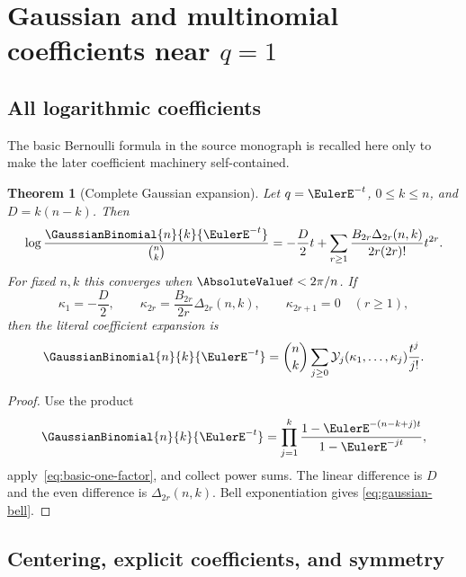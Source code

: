 \documentclass[11pt,oneside]{article}
\newtheorem{theorem}{Theorem}[section]
\theoremstyle{definition}
\theoremstyle{remark}
\newcommand{\Bell}{\mathcal Y}
\let\reporttopsection\section
\let\reportsubsection\subsection
\let\chapter\reporttopsection
\let\section\reportsubsection
\begin{document}
\chapter{Gaussian and multinomial coefficients near \texorpdfstring{$q=1$}{q = 1}}\label{chap:gaussian-qone}

\section{All logarithmic coefficients}

The basic Bernoulli formula in the source monograph is recalled here only to
make the later coefficient machinery self-contained.

\begin{theorem}[Complete Gaussian expansion]\label{thm:gaussian-complete}
Let $q=\EulerE^{-t}$, $0\le k\le n$, and $D=k(n-k)$.  Then
\begin{equation}\label{eq:gaussian-log-all}
 \log\frac{\GaussianBinomial{n}{k}{\EulerE^{-t}}}{\binom nk}
 =-\frac D2t+
 \sum_{r\ge1}\frac{B_{2r}\Delta_{2r}(n,k)}{2r(2r)!}t^{2r}.
\end{equation}
For fixed $n,k$ this converges when $\AbsoluteValue t<2\pi/n$.  If
\[
 \kappa_1=-\frac D2,
 \qquad
 \kappa_{2r}=\frac{B_{2r}}{2r}\Delta_{2r}(n,k),
 \qquad
 \kappa_{2r+1}=0\quad(r\ge1),
\]
then the literal coefficient expansion is
\begin{equation}\label{eq:gaussian-bell}
 \GaussianBinomial{n}{k}{\EulerE^{-t}}
 =\binom nk\sum_{j\ge0}
 \Bell_j(\kappa_1,\ldots,\kappa_j)\frac{t^j}{j!}.
\end{equation}
\end{theorem}

\begin{proof}
Use the product
\[
 \GaussianBinomial{n}{k}{\EulerE^{-t}}
 =\prod_{j=1}^{k}
 \frac{1-\EulerE^{-(n-k+j)t}}{1-\EulerE^{-jt}},
\]
apply~\eqref{eq:basic-one-factor}, and collect power sums.  The linear
difference is $D$ and the even difference is
$\Delta_{2r}(n,k)$.  Bell exponentiation gives
\eqref{eq:gaussian-bell}.
\end{proof}

\section{Centering, explicit coefficients, and symmetry}
\end{document}
